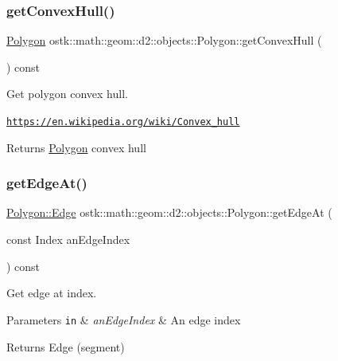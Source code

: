 \subsubsection{\texorpdfstring{get\+Convex\+Hull()}{getConvexHull()}}
{\footnotesize\ttfamily \hyperlink{classostk_1_1math_1_1geom_1_1d2_1_1objects_1_1_polygon}{Polygon} ostk\+::math\+::geom\+::d2\+::objects\+::\+Polygon\+::get\+Convex\+Hull (\begin{DoxyParamCaption}{ }\end{DoxyParamCaption}) const}



Get polygon convex hull. 

\href{https://en.wikipedia.org/wiki/Convex_hull}{\tt https\+://en.\+wikipedia.\+org/wiki/\+Convex\+\_\+hull}

\begin{DoxyReturn}{Returns}
\hyperlink{classostk_1_1math_1_1geom_1_1d2_1_1objects_1_1_polygon}{Polygon} convex hull 
\end{DoxyReturn}
\mbox{\label{classostk_1_1math_1_1geom_1_1d2_1_1objects_1_1_polygon_a247cba455e33ab1a05c43de43c27ba48}} 
\subsubsection{\texorpdfstring{get\+Edge\+At()}{getEdgeAt()}}
{\footnotesize\ttfamily \hyperlink{classostk_1_1math_1_1geom_1_1d2_1_1objects_1_1_polygon_a85e5c92944c126a62464874b5a6ba490}{Polygon\+::\+Edge} ostk\+::math\+::geom\+::d2\+::objects\+::\+Polygon\+::get\+Edge\+At (\begin{DoxyParamCaption}\item[{const Index}]{an\+Edge\+Index }\end{DoxyParamCaption}) const}



Get edge at index. 


\begin{DoxyParams}[1]{Parameters}
\mbox{\tt in}  & {\em an\+Edge\+Index} & An edge index \\
\hline
\end{DoxyParams}
\begin{DoxyReturn}{Returns}
Edge (segment) 
\end{DoxyReturn}
\mbox{\label{classostk_1_1math_1_1geom_1_1d2_1_1objects_1_1_polygon_a585310d630d1e80f496a9525a308bb2b}} 
